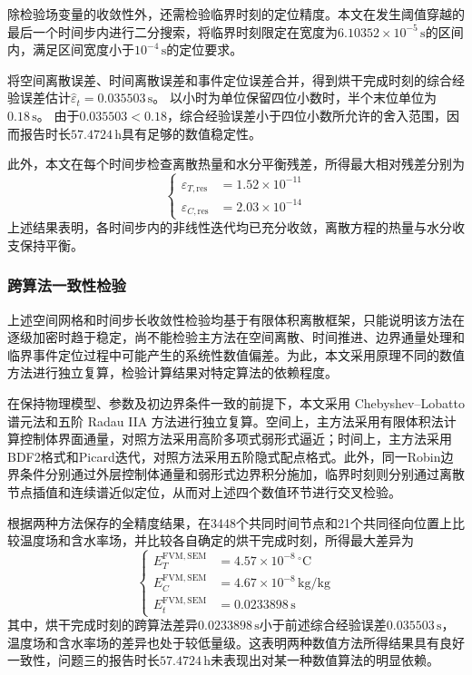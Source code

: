 \documentclass[withoutpreface,bwprint]{cumcmthesis}
\begin{document}
除检验场变量的收敛性外，还需检验临界时刻的定位精度。本文在发生阈值穿越的最后一个时间步内进行二分搜索，将临界时刻限定在宽度为$6.10352\times10^{-5}\,\mathrm s$的区间内，满足区间宽度小于$10^{-4}\,\mathrm s$的定位要求。

将空间离散误差、时间离散误差和事件定位误差合并，得到烘干完成时刻的综合经验误差估计$\widehat\varepsilon_t=0.035503\,\mathrm s$。
以小时为单位保留四位小数时，半个末位单位为$0.18\,\mathrm s$。
由于$0.035503<0.18$，综合经验误差小于四位小数所允许的舍入范围，因而报告时长$57.4724\,\mathrm h$具有足够的数值稳定性。

此外，本文在每个时间步检查离散热量和水分平衡残差，所得最大相对残差分别为
\begin{equation}
\left\{
\begin{aligned}
\varepsilon_{T,\mathrm{res}}&=1.52\times10^{-11}\\
\varepsilon_{C,\mathrm{res}}&=2.03\times10^{-14}
\end{aligned}
\right.
\label{eq:q3-discrete-residuals}
\end{equation}
上述结果表明，各时间步内的非线性迭代均已充分收敛，离散方程的热量与水分收支保持平衡。

\subsubsection{跨算法一致性检验}

上述空间网格和时间步长收敛性检验均基于有限体积离散框架，只能说明该方法在逐级加密时趋于稳定，尚不能检验主方法在空间离散、时间推进、边界通量处理和临界事件定位过程中可能产生的系统性数值偏差。为此，本文采用原理不同的数值方法进行独立复算，检验计算结果对特定算法的依赖程度。

在保持物理模型、参数及初边界条件一致的前提下，本文采用 Chebyshev--Lobatto 谱元法\cite{trefethen2000}和五阶 Radau IIA 方法\cite{hairer1996}进行独立复算。空间上，主方法采用有限体积法计算控制体界面通量，对照方法采用高阶多项式弱形式逼近；时间上，主方法采用BDF2格式和Picard迭代，对照方法采用五阶隐式配点格式。此外，同一Robin边界条件分别通过外层控制体通量和弱形式边界积分施加，临界时刻则分别通过离散节点插值和连续谱近似定位，从而对上述四个数值环节进行交叉检验。

根据两种方法保存的全精度结果，在3448个共同时间节点和21个共同径向位置上比较温度场和含水率场，并比较各自确定的烘干完成时刻，所得最大差异为
\begin{equation}
\left\{
\begin{aligned}
E_T^{\mathrm{FVM,SEM}}&=4.57\times10^{-8}\,{}^\circ\mathrm C\\
E_C^{\mathrm{FVM,SEM}}&=4.67\times10^{-8}\,\mathrm{kg/kg}\\
E_t^{\mathrm{FVM,SEM}}&=0.0233898\,\mathrm s
\end{aligned}
\right.
\label{eq:q3-cross-algorithm-differences}
\end{equation}
其中，烘干完成时刻的跨算法差异$0.0233898\,\mathrm s$小于前述综合经验误差$0.035503\,\mathrm s$，温度场和含水率场的差异也处于较低量级。这表明两种数值方法所得结果具有良好一致性，问题三的报告时长$57.4724\,\mathrm h$未表现出对某一种数值算法的明显依赖。
\end{document}
